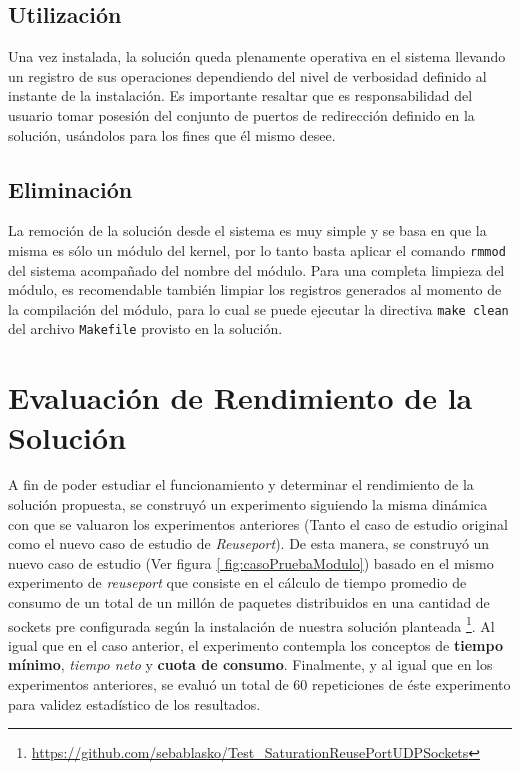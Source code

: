 \subsection{Utilización}
Una vez instalada, la solución queda plenamente operativa en el sistema llevando un registro de sus operaciones dependiendo del nivel de verbosidad definido al instante de la instalación. Es importante resaltar que es responsabilidad del usuario tomar posesión del conjunto de puertos de redirección definido en la solución, usándolos para los fines que él mismo desee.

\subsection{Eliminación}
La remoción de la solución desde el sistema es muy simple y se basa en que la misma es sólo un módulo del kernel, por lo tanto basta aplicar el comando \verb=rmmod= del sistema acompañado del nombre del módulo. Para una completa limpieza del módulo, es recomendable también limpiar los registros generados al momento de la compilación del módulo, para lo cual se puede ejecutar la directiva \verb=make clean= del archivo \verb=Makefile= provisto en la solución.

\section{Evaluación de Rendimiento de la Solución}

A fin de poder estudiar el funcionamiento y determinar el rendimiento de la solución propuesta, se construyó un experimento siguiendo la misma dinámica con que se valuaron los experimentos anteriores (Tanto el caso de estudio original como el nuevo caso de estudio de \emph{Reuseport}). De esta manera, se construyó un nuevo caso de estudio (Ver figura \ref{ fig:casoPruebaModulo}) basado en el mismo experimento de \emph{reuseport} que consiste en el cálculo de tiempo promedio de consumo de un total de un millón de paquetes distribuidos en una cantidad de sockets pre configurada según la instalación de nuestra solución planteada \footnote{\url{ https://github.com/sebablasko/Test_SaturationReusePortUDPSockets}}. Al igual que en el caso anterior, el experimento contempla los conceptos de \textbf{tiempo mínimo}, \emph{tiempo neto} y \textbf{cuota de consumo}. Finalmente, y al igual que en los experimentos anteriores, se evaluó un total de 60 repeticiones de éste experimento para validez estadístico de los resultados.

